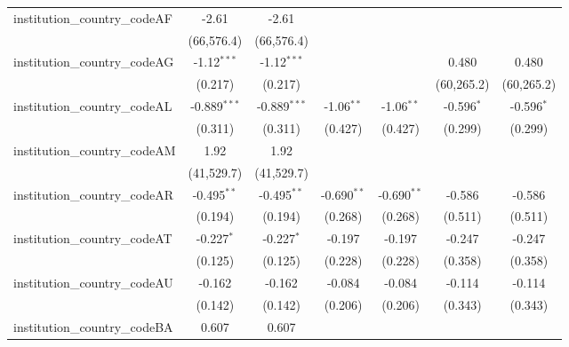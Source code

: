 \begin{tabular}{lcccccc}
   institution\_country\_codeAF          & -2.61          & -2.61          &                &                &                &   \\   
                                         & (66,576.4)     & (66,576.4)     &                &                &                &   \\   
   institution\_country\_codeAG          & -1.12$^{***}$  & -1.12$^{***}$  &                &                & 0.480          & 0.480\\   
                                         & (0.217)        & (0.217)        &                &                & (60,265.2)     & (60,265.2)\\   
   institution\_country\_codeAL          & -0.889$^{***}$ & -0.889$^{***}$ & -1.06$^{**}$   & -1.06$^{**}$   & -0.596$^{*}$   & -0.596$^{*}$\\   
                                         & (0.311)        & (0.311)        & (0.427)        & (0.427)        & (0.299)        & (0.299)\\   
   institution\_country\_codeAM          & 1.92           & 1.92           &                &                &                &   \\   
                                         & (41,529.7)     & (41,529.7)     &                &                &                &   \\   
   institution\_country\_codeAR          & -0.495$^{**}$  & -0.495$^{**}$  & -0.690$^{**}$  & -0.690$^{**}$  & -0.586         & -0.586\\   
                                         & (0.194)        & (0.194)        & (0.268)        & (0.268)        & (0.511)        & (0.511)\\   
   institution\_country\_codeAT          & -0.227$^{*}$   & -0.227$^{*}$   & -0.197         & -0.197         & -0.247         & -0.247\\   
                                         & (0.125)        & (0.125)        & (0.228)        & (0.228)        & (0.358)        & (0.358)\\   
   institution\_country\_codeAU          & -0.162         & -0.162         & -0.084         & -0.084         & -0.114         & -0.114\\   
                                         & (0.142)        & (0.142)        & (0.206)        & (0.206)        & (0.343)        & (0.343)\\   
   institution\_country\_codeBA          & 0.607          & 0.607          &                &                &                &   \\   

\end{tabular}
